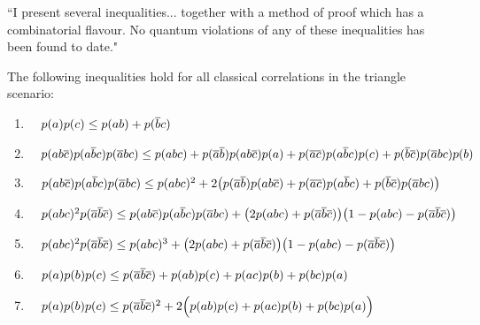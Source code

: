 {``I present several inequalities... together with a method of proof which has a combinatorial flavour. No quantum violations of any of these inequalities has been found to date."
%
\begin{theorem}
The following inequalities hold for all classical correlations in the triangle scenario:
\begin{enumerate}
\item
\(\quad
p(a) p(c)  \leq  p(a b) + p(\nb c)
\)
\item
\(\quad
p(a b\nc) p(a \nb c) p(\na b c) \leq p(a b c) + p(\na \nb) p(a b \nc) p(a) + p(\na\nc) p(a\nb c) p(c)  + p(\nb \nc) p(\na b c) p(b)
\)
\item 
\(\quad
p(a b\nc) p(a \nb c) p(\na b c) \leq p(a b c)^2 + 2\parens*{p(\na \nb) p(a b \nc) + p(\na\nc) p(a\nb c)  + p(\nb \nc) p(\na b c)}
\)
\item
\(\quad
p(a b c)^2 p(\na\nb\nc)  \leq  p(a b \nc) p(a \nb c) p(\na b c) + \parens*{2 p(a b c) + p(\na\nb\nc)} \parens*{1 - p(a b c) - p(\na\nb\nc)}
\)
\item
\(\quad
p(a b c)^2 p(\na\nb\nc)  \leq  p(a b c)^3 + \parens*{2 p(a b c) + p(\na\nb\nc)} \parens*{1 - p(a b c) - p(\na\nb\nc)}
\)
\item
\(\quad
p(a) p(b) p(c) \leq  p(\na\nb\nc) + p(a b) p(c) + p(a c) p(b) + p(b c) p(a)
\)
\item
\(\quad
p(a) p(b) p(c) \leq  p(\na\nb\nc)^2 +2\parens[\Big]{ p(a b) p(c) + p(a c) p(b) + p(b c) p(a) }
\)
\end{enumerate}
\end{theorem}

}
